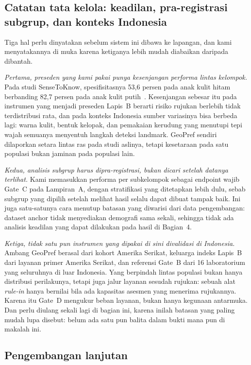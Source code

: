 \documentclass{article}
\begin{document}
\subsection{Catatan tata kelola: keadilan, pra-registrasi subgrup, dan konteks Indonesia}
\label{sec:tatakelola}

Tiga hal perlu dinyatakan sebelum sistem ini dibawa ke lapangan, dan kami menyatakannya di
muka karena ketiganya lebih mudah diabaikan daripada dibantah.

\emph{Pertama, preseden yang kami pakai punya kesenjangan performa lintas kelompok.} Pada
studi SenseToKnow, spesifisitasnya 53,6 persen pada anak kulit hitam berbanding 82,7 persen
pada anak kulit putih~\cite{perochon2023}. Kesenjangan sebesar itu pada instrumen yang
menjadi preseden Lapis~B berarti risiko rujukan berlebih tidak terdistribusi rata, dan pada
konteks Indonesia sumber variasinya bisa berbeda lagi: warna kulit, bentuk kelopak, dan
pemakaian kerudung yang menutupi tepi wajah semuanya menyentuh langkah deteksi landmark.
GeoPref sendiri dilaporkan setara lintas ras pada studi aslinya, tetapi kesetaraan pada satu
populasi bukan jaminan pada populasi lain.

\emph{Kedua, analisis subgrup harus dipra-registrasi, bukan dicari setelah datanya terlihat.}
Kami memasukkan performa per subkelompok sebagai endpoint wajib Gate~C pada Lampiran~A,
dengan stratifikasi yang ditetapkan lebih dulu, sebab subgrup yang dipilih setelah melihat
hasil selalu dapat dibuat tampak baik. Ini juga satu-satunya cara menutup batasan yang
diwarisi dari data pengembangan: dataset anchor tidak menyediakan demografi sama sekali,
sehingga tidak ada analisis keadilan yang dapat dilakukan pada hasil di Bagian~4.

\emph{Ketiga, tidak satu pun instrumen yang dipakai di sini divalidasi di Indonesia.}
Ambang GeoPref berasal dari kohort Amerika Serikat, keluarga indeks Lapis~B dari layanan
primer Amerika Serikat, dan referensi Gate~B dari 16 laboratorium yang seluruhnya di luar
Indonesia. Yang berpindah lintas populasi bukan hanya distribusi perilakunya, tetapi juga
jalur layanan sesudah rujukan: sebuah alat \emph{rule-in} hanya bernilai bila ada kapasitas
asesmen yang menerima rujukannya. Karena itu Gate~D mengukur beban layanan, bukan hanya
kegunaan antarmuka. Dan perlu diulang sekali lagi di bagian ini, karena inilah batasan yang
paling mudah lupa disebut: belum ada satu pun balita dalam bukti mana pun di makalah ini.

\subsection{Pengembangan lanjutan}
\label{sec:lanjut}
\end{document}
